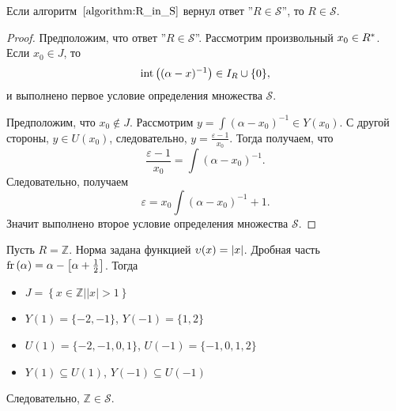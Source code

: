 \documentclass[_00_dissertation.tex]{subfiles}
\begin{document}
\begin{proposition}
    Если алгоритм~$\ref{algorithm:R_in_S}$ вернул ответ ''$R \in \mathcal{S}$'', то $R \in \mathcal{S}$.
\end{proposition}
\begin{proof}
    Предположим, что ответ ''$R \in \mathcal{S}$''.
    Рассмотрим произвольный $x_0 \in R^{*}$.
    Если $x_0 \in J$, то
    \begin{equation*}
        \textrm{int}\left((\alpha - x)^{-1}\right) \in I_{R} \cup \{0\},
    \end{equation*}
    и выполнено первое условие определения множества $\mathcal{S}$.
    
    Предположим, что $x_0 \not\in J$.
    Рассмотрим $y = \int{(\alpha - x_0)^{-1}} \in Y(x_0)$.
    С другой стороны, $y \in U(x_0)$, следовательно, $y = \frac{\varepsilon - 1}{x_0}$.
    Тогда получаем, что
    \begin{equation*}
        \frac{\varepsilon - 1}{x_0} = \int{(\alpha - x_0)^{-1}}.
    \end{equation*}
    Следовательно, получаем
    \begin{equation*}
        \varepsilon = x_0 \int{(\alpha - x_0)^{-1}} + 1.
    \end{equation*}
    Значит выполнено второе условие определения множества $\mathcal{S}$.
\end{proof}


\begin{example}\label{example:Z}
    Пусть $R = \mathbb{Z}$.
    Норма задана функцией $\upsilon(x) = |x|$.
    Дробная часть $\textrm{fr}\left(\alpha\right) = \alpha - \left[\alpha + \frac{1}{2}\right]$.
    Тогда
    \begin{itemize}
        \item $J = \left\{x \in \mathbb{Z} \big| |x| > 1\right\}$
        
        \item $Y(1) = \{-2, -1\}$, $Y(-1) = \{1, 2\}$
        
        \item $U(1) = \{-2, -1, 0, 1\}$, $U(-1) = \{-1, 0, 1, 2\}$
        
        \item $Y(1) \subseteq U(1)$, $Y(-1) \subseteq U(-1)$
    \end{itemize}
    
    Следовательно, $\mathbb{Z} \in \mathcal{S}$.
\end{example}
\end{document}
